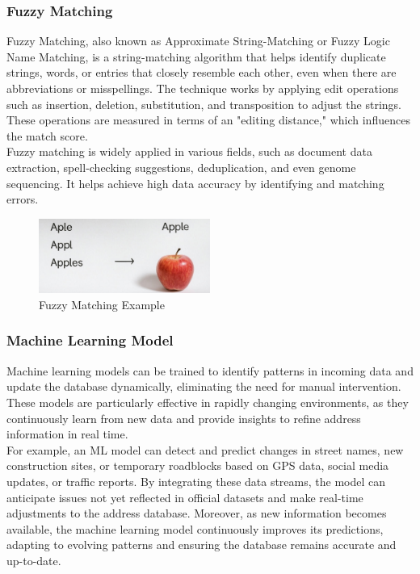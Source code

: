         \subsubsection{Fuzzy Matching}
        Fuzzy Matching, also known as Approximate String-Matching or Fuzzy Logic Name Matching, is a string-matching algorithm that helps identify duplicate strings, words, or entries that closely resemble each other, even when there are abbreviations or misspellings. The technique works by applying edit operations such as insertion, deletion, substitution, and transposition to adjust the strings. These operations are measured in terms of an "editing distance," which influences the match score.\\
        
        Fuzzy matching is widely applied in various fields, such as document data extraction, spell-checking suggestions, deduplication, and even genome sequencing. It helps achieve high data accuracy by identifying and matching errors. \autocite{Nieters2024Dec}

        \begin{figure}[H]
            \centering
            \includegraphics[width=0.5\textwidth]{images/AdminPanel/FuzzyMatching.png}
            \caption{Fuzzy Matching Example}
            \label{fig:fuzzy-matching}
        \end{figure}

        \subsubsection{Machine Learning Model}
        Machine learning models can be trained to identify patterns in incoming data and update the database dynamically, eliminating the need for manual intervention. These models are particularly effective in rapidly changing environments, as they continuously learn from new data and provide insights to refine address information in real time.\\

        For example, an ML model can detect and predict changes in street names, new construction sites, or temporary roadblocks based on GPS data, social media updates, or traffic reports. By integrating these data streams, the model can anticipate issues not yet reflected in official datasets and make real-time adjustments to the address database. Moreover, as new information becomes available, the machine learning model continuously improves its predictions, adapting to evolving patterns and ensuring the database remains accurate and up-to-date. \autocite{Encora2023Nov}
        
